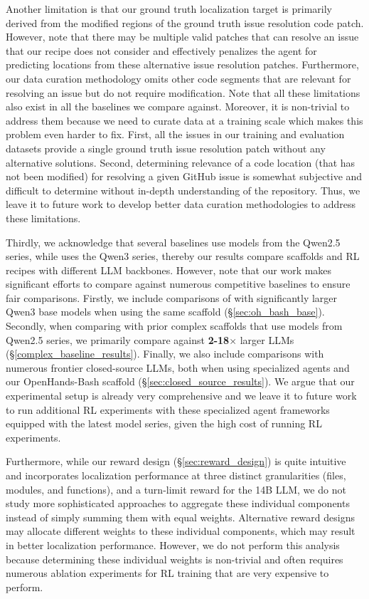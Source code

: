 Another limitation is that our ground truth localization target is primarily derived from the modified regions of the ground truth issue resolution code patch. However, note that there may be multiple valid patches that can resolve an issue that our recipe does not consider and effectively penalizes the agent for predicting locations from these alternative issue resolution patches. Furthermore, our data curation methodology omits other code segments that are relevant for resolving an issue but do not require modification. Note that all these limitations also exist in all the baselines we compare \methodname against. Moreover, it is non-trivial to address them because we need to curate data at a training scale which makes this problem even harder to fix. First, all the issues in our training and evaluation datasets provide a single ground truth issue resolution patch without any alternative solutions. Second, determining relevance of a code location (that has not been modified) for resolving a given GitHub issue is somewhat subjective and difficult to determine without in-depth understanding of the repository. Thus, we leave it to future work to develop better data curation methodologies to address these limitations.

Thirdly, we acknowledge that several baselines use models from the Qwen2.5 series, while \methodname uses the Qwen3 series, thereby our results compare scaffolds and RL recipes with different LLM backbones. However, note that our work makes significant efforts to compare \methodname against numerous competitive baselines to ensure fair comparisons. Firstly, we include comparisons of \methodname with significantly larger Qwen3 base models when using the same scaffold (\S\ref{sec:oh_bash_base}). Secondly, when comparing with prior complex scaffolds that use models from Qwen2.5 series, we primarily compare \methodname against \textbf{2-18$\times$} larger LLMs (\S\ref{complex_baseline_results}). Finally, we also include comparisons with numerous frontier closed-source LLMs, both when using specialized agents and our OpenHands-Bash scaffold (\S\ref{sec:closed_source_results}). We argue that our experimental setup is already very comprehensive and we leave it to future work to run additional RL experiments with these specialized agent frameworks equipped with the latest model series, given the high cost of running RL experiments.

Furthermore, while our reward design (\S\ref{sec:reward_design}) is quite intuitive and incorporates localization performance at three distinct granularities (files, modules, and functions), and a turn-limit reward for the 14B LLM, we do not study more sophisticated approaches to aggregate these individual components instead of simply summing them with equal weights. Alternative reward designs may allocate different weights to these individual components, which may result in better localization performance. However, we do not perform this analysis because determining these individual weights is non-trivial and often requires numerous ablation experiments for RL training that are very expensive to perform.

